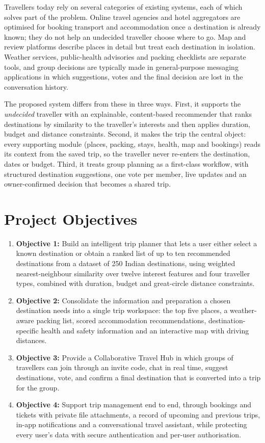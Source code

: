 Travellers today rely on several categories of existing systems, each of
which solves part of the problem. Online travel agencies and hotel
aggregators are optimised for booking transport and accommodation once a
destination is already known; they do not help an undecided traveller choose
where to go. Map and review platforms describe places in detail but treat
each destination in isolation. Weather services, public-health advisories
and packing checklists are separate tools, and group decisions are typically
made in general-purpose messaging applications in which suggestions, votes
and the final decision are lost in the conversation history.

The proposed system differs from these in three ways. First, it supports the
\emph{undecided} traveller with an explainable, content-based recommender
\cite{lops2011content} that ranks destinations by similarity to the
traveller's interests and then applies duration, budget and distance
constraints. Second, it makes the trip the central object: every supporting
module (places, packing, stays, health, map and bookings) reads its context
from the saved trip, so the traveller never re-enters the destination, dates
or budget. Third, it treats group planning as a first-class workflow, with
structured destination suggestions, one vote per member, live updates and an
owner-confirmed decision that becomes a shared trip.

\section{Project Objectives}
\label{sec:objectives}

\begin{enumerate}
  \item \textbf{Objective 1:} Build an intelligent trip planner that lets a
    user either select a known destination or obtain a ranked list of up to
    ten recommended destinations from a dataset of 250 Indian destinations,
    using weighted nearest-neighbour similarity over twelve interest features
    and four traveller types, combined with duration, budget and
    great-circle distance constraints.
  \item \textbf{Objective 2:} Consolidate the information and preparation a
    chosen destination needs into a single trip workspace: the top five
    places, a weather-aware packing list, scored accommodation
    recommendations, destination-specific health and safety information and
    an interactive map with driving distances.
  \item \textbf{Objective 3:} Provide a Collaborative Travel Hub in which
    groups of travellers can join through an invite code, chat in real time,
    suggest destinations, vote, and confirm a final destination that is
    converted into a trip for the group.
  \item \textbf{Objective 4:} Support trip management end to end, through
    bookings and tickets with private file attachments, a record of upcoming
    and previous trips, in-app notifications and a conversational travel
    assistant, while protecting every user's data with secure authentication
    and per-user authorisation.
\end{enumerate}

